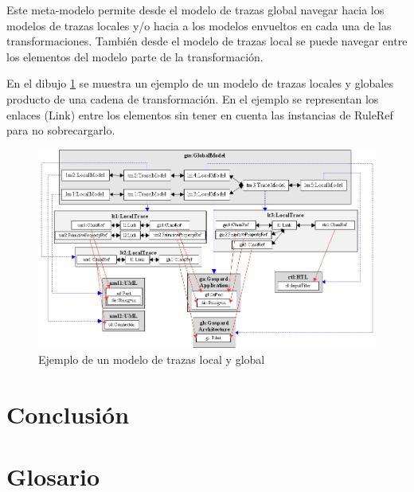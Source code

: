 \documentclass[a4paper,12pt,oneside]{book}
\begin{document}
Este meta-modelo permite desde el modelo de trazas global navegar hacia los modelos de trazas locales y/o hacia a los modelos envueltos en cada una de las transformaciones. También desde el modelo de trazas local se puede navegar entre los elementos del modelo parte de la transformación.

En el dibujo \ref{fig:EjemploLocalGlobalMetamodel} se muestra un ejemplo de un modelo de trazas locales y globales producto de una cadena de transformación. En el ejemplo se representan los enlaces (Link) entre los elementos sin tener en cuenta las instancias de RuleRef para no sobrecargarlo.

\begin{figure}[hbtp]
\centering
\includegraphics[scale=.45]{./img/EjemploLocalGlobalMetamodel}
\caption{Ejemplo de un modelo de trazas local y global}
\label{fig:EjemploLocalGlobalMetamodel}
\end{figure}


\backmatter

\chapter{Conclusión}


\chapter{Glosario}
\end{document}
